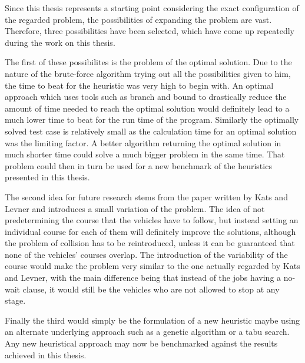Since this thesis represents a starting point considering the exact configuration of the regarded problem, the possibilities of expanding the problem are vast. Therefore, three possibilities have been selected, which have come up repeatedly during the work on this thesis.

The first of these possibilites is the problem of the optimal solution. Due to the nature of the brute-force algorithm trying out all the possibilities given to him, the time to beat for the heuristic was very high to begin with. An optimal approach which uses tools such as branch and bound to drastically reduce the amount of time needed to reach the optimal solution would definitely lead to a much lower time to beat for the run time of the program. Similarly the optimally solved test case is relatively small as the calculation time for an optimal solution was the limiting factor. A better algorithm returning the optimal solution in much shorter time could solve a much bigger problem in the same time. That problem could then in turn be used for a new benchmark of the heuristics presented in this thesis.

The second idea for future research stems from the paper written by Kats and Levner \cite{kats1997b} and introduces a small variation of the problem. The idea of not predetermining the course that the vehicles have to follow, but instead setting an individual course for each of them will definitely improve the solutions, although the problem of collision has to be reintroduced, unless it can be guaranteed that none of the vehicles' courses overlap. The introduction of the variability of the course would make the problem very similar to the one actually regarded by Kats and Levner, with the main difference being that instead of the jobs having a no-wait clause, it would still be the vehicles who are not allowed to stop at any stage.

Finally the third would simply be the formulation of a new heuristic maybe using an alternate underlying approach such as a genetic algorithm or a tabu search. Any new heuristical approach may now be benchmarked against the results achieved in this thesis.